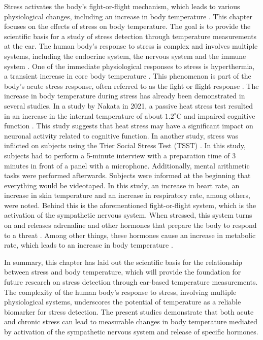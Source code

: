 Stress activates the body's fight-or-flight mechanism, which leads to various physiological changes, including an increase in body temperature \cite{marazzitiPsychologicalStressBody1992}. 
This chapter focuses on the effects of stress on body temperature. 
The goal is to provide the scientific basis for a study of stress detection through temperature measurements at the ear.
The human body's response to stress is complex and involves multiple systems, including the endocrine system, the nervous system and the immune system \cite{jamesUnderstandingRelationshipsPhysiological2023}. 
One of the immediate physiological responses to stress is hyperthermia, a transient increase in core body temperature \cite{vinkersEffectStressCore2013}. 
This phenomenon is part of the body's acute stress response, often referred to as the fight or flight response \cite{vinkersEffectStressCore2013}.
The increase in body temperature during stress has already been demonstrated in several studies.
In a study by Nakata in 2021, a passive heat stress test resulted in an increase in the internal temperature of about $1.2 ^\circ\text{C}$ and impaired cognitive function \cite{nakataEffectsPassiveHeat2021}. 
This study suggests that heat stress may have a significant impact on neuronal activity related to cognitive function.
In another study, stress was inflicted on subjects using the Trier Social Stress Test (TSST) \cite{vinkersEffectStressCore2013}. 
In this study, subjects had to perform a 5-minute interview with a preparation time of 3 minutes in front of a panel with a microphone. 
Additionally, mental arithmetic tasks were performed afterwards. 
Subjects were informed at the beginning that everything would be videotaped.
In this study, an increase in heart rate, an increase in skin temperature and an increase in respiratory rate, among others, were noted. 
Behind this is the aforementioned fight-or-flight system, which is the activation of the sympathetic nervous system. 
When stressed, this system turns on and releases adrenaline and other hormones that prepare the body to respond to a threat \cite{jeremItCoolBe2023}.
Among other things, these hormones cause an increase in metabolic rate, which leads to an increase in body temperature \cite{greaneyNeurovascularResponsesWholebody2014}.

In summary, this chapter has laid out the scientific basis for the relationship between stress and body temperature, which will provide the foundation for future research on stress detection through ear-based temperature measurements. 
The complexity of the human body's response to stress, involving multiple physiological systems, underscores the potential of temperature as a reliable biomarker for stress detection. 
The present studies demonstrate that both acute and chronic stress can lead to measurable changes in body temperature mediated by activation of the sympathetic nervous system and release of specific hormones.

